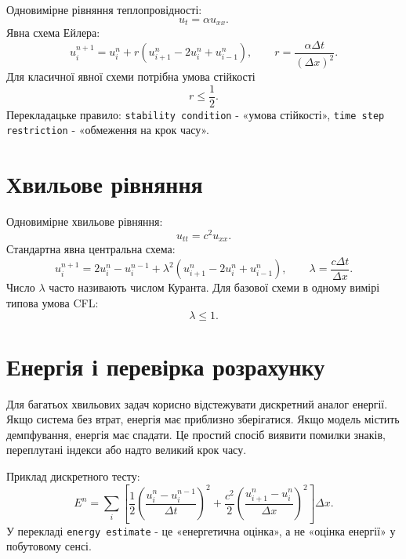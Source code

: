 Одновимірне рівняння теплопровідності:
\begin{equation}
    u_t = \alpha u_{xx}.
\end{equation}
Явна схема Ейлера:
\begin{equation}
    u_i^{n+1}=u_i^n+r\left(u_{i+1}^n-2u_i^n+u_{i-1}^n\right),
    \qquad
    r=\frac{\alpha\Delta t}{(\Delta x)^2}.
\end{equation}
Для класичної явної схеми потрібна умова стійкості
\begin{equation}
    r\leq \frac{1}{2}.
\end{equation}
Перекладацьке правило: \texttt{stability condition} - «умова стійкості», \texttt{time step restriction} - «обмеження на крок часу».

\section{Хвильове рівняння}

Одновимірне хвильове рівняння:
\begin{equation}
    u_{tt}=c^2u_{xx}.
\end{equation}
Стандартна явна центральна схема:
\begin{equation}
    u_i^{n+1}=2u_i^n-u_i^{n-1}+\lambda^2\left(u_{i+1}^n-2u_i^n+u_{i-1}^n\right),
    \qquad
    \lambda=\frac{c\Delta t}{\Delta x}.
\end{equation}
Число $\lambda$ часто називають числом Куранта. Для базової схеми в одному вимірі типова умова CFL:
\begin{equation}
    \lambda\leq 1.
\end{equation}

\section{Енергія і перевірка розрахунку}

Для багатьох хвильових задач корисно відстежувати дискретний аналог енергії. Якщо система без втрат, енергія має приблизно зберігатися. Якщо модель містить демпфування, енергія має спадати. Це простий спосіб виявити помилки знаків, переплутані індекси або надто великий крок часу.

Приклад дискретного тесту:
\begin{equation}
    E^n = \sum_i \left[\frac{1}{2}\left(\frac{u_i^n-u_i^{n-1}}{\Delta t}\right)^2
    +\frac{c^2}{2}\left(\frac{u_{i+1}^n-u_i^n}{\Delta x}\right)^2\right]\Delta x.
\end{equation}
У перекладі \texttt{energy estimate} - це «енергетична оцінка», а не «оцінка енергії» у побутовому сенсі.

